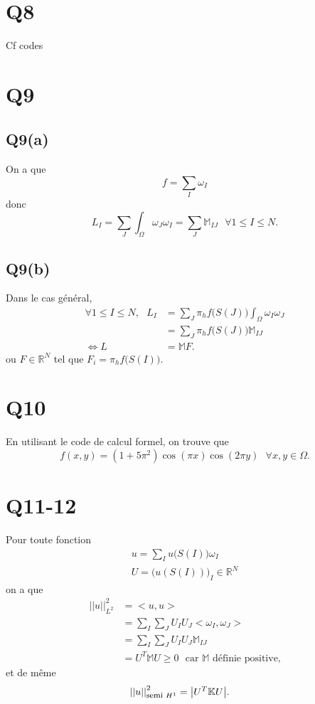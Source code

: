 \documentclass[11pt]{article}
\newcommand{\smbox}[1]{\mbox{\footnotesize #1}}
\newcommand{\R}{\mathbb{R}}
\newcommand{\K}{\mathbb{K}}
\newcommand{\M}{\mathbb{M}}
\newcommand{\ms}{~~~}
\newcommand{\norm}[1]{\left|\left|#1\right|\right|}
\begin{document}
\section{Q8}

Cf codes

\section{Q9}
\subsection{Q9(a)}
On a que
\begin{equation}
  f = \sum_I \omega_I
\end{equation}
donc
\begin{equation}
  L_I = \sum_J \int_\Omega \omega_J \omega_I = \sum_J \M_{IJ} \ms \forall 1 \leq I \leq N. 
\end{equation}

\subsection{Q9(b)}

Dans le cas général,
\begin{align}
  \forall 1 \leq I \leq N, \ms L_I
  &= \sum_J \pi_h f\big(S(J)\big) \int_\Omega \omega_I \omega_J \\
  &= \sum_J \pi_h f\big(S(J)\big) \M_{IJ} \\
  \Leftrightarrow
  L &= \M F.
\end{align}
ou $F\in\R^{ N}$ tel que $F_i = \pi_h f\big(S(I)\big)$.

\section{Q10}

En utilisant le code de calcul formel, on trouve que
\begin{equation}
  f(x,y) = (1+5\pi^2)\cos(\pi x)\cos(2\pi y) \ms \forall x,y\in\Omega.
\end{equation}

\section{Q11-12}

Pour toute fonction
\begin{align}
  u = \sum_I u\big(S(I)\big) \omega_I \\
  U = \big(u(S(I))\big)_I \in \R^{ N}
\end{align}
on a que
\begin{align}
  \norm{u}_{L^2}^2 &= \big<u, u\big> \\
                   &= \sum_I \sum_J U_I U_J \big< \omega_I, \omega_J\big> \\
                   &= \sum_I \sum_J U_I U_J \M_{IJ} \\
                   &= U^T \M U \geq 0 \ms \mbox{car $\M$ définie positive,}
\end{align}
et de même
\begin{align}
  \norm{u}_{\smbox{semi~} H^1}^2 &= \big|U^T \K U \big|.
\end{align}
\end{document}
